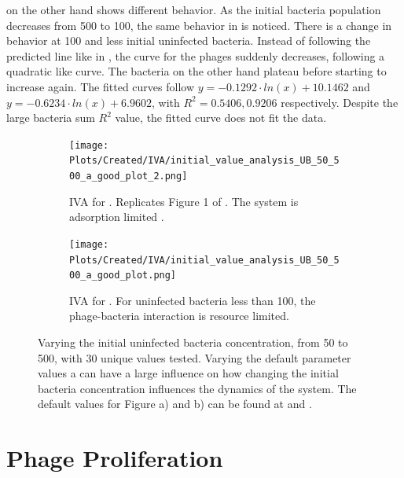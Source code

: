  on the other hand shows different behavior. 
As the initial bacteria population decreases from 500 to 100, the same behavior in  is noticed.
There is a change in behavior at 100 and less initial uninfected bacteria. 
Instead of following the predicted line like in , the curve for the phages suddenly decreases, following a quadratic like curve. 
The bacteria on the other hand plateau before starting to increase again. 
The fitted curves follow $y = -0.1292\cdot ln(x) + 10.1462$ and $y = -0.6234\cdot ln(x)+6.9602$, with $R^2=0.5406, 0.9206$ respectively. 
Despite the large bacteria sum $R^2$ value, the fitted curve does not fit the data. 

\begin{figure}
    \centering
    \begin{subfigure}{1\linewidth}
        \centering
        \texttt{[image: Plots/Created/IVA/initial\_value\_analysis\_UB\_50\_500\_a\_good\_plot\_2.png]}
        \caption{
            IVA for . 
            Replicates Figure 1 of \citet{mullaExtremeDiversityPhage2024}. 
            The system is adsorption limited \cite{mullaExtremeDiversityPhage2024}. 
        }
        \label{fig:created:initial_value_analysis_UB_50_500_a_good_plot_2}
    \end{subfigure}
    \hfill
    \begin{subfigure}{1\linewidth}
        \centering
        \texttt{[image: Plots/Created/IVA/initial\_value\_analysis\_UB\_50\_500\_a\_good\_plot.png]}
        \caption{
            IVA for . 
            For uninfected bacteria less than 100, the phage-bacteria interaction is resource limited. 
        }
        \label{fig:created:initial_value_analysis_UB_50_500_a_good_plot}
    \end{subfigure}
    \caption{
        Varying the initial uninfected bacteria concentration, from 50 to 500, with 30 unique values tested. 
        Varying the default parameter values a can have a large influence on how changing the initial bacteria concentration influences the dynamics of the system. 
        The default values for Figure a) and b) can be found at  and . 
    }
\end{figure}

\section{Phage Proliferation}
\label{sec:results:phase_portrait}
